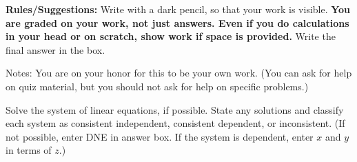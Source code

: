 \documentclass[11pt,addpoints,answers]{exam}
\newcommand{\+}{\, \, + \, \, }
\renewcommand{\-}{\, \, - \, \, }
\renewcommand{\=}{\, \, = \, \, }
\begin{document}


{\small \noindent \textbf{Rules/Suggestions:} Write with a dark pencil, so that your work is visible.  \textbf{You are graded on your work, not just answers. Even if you do calculations in your head or on scratch, show work if space is provided. } Write the final answer in the box.

Notes: You are on your honor for this to be your own work.  (You can ask for help on quiz material, but you should not ask for help on specific problems.) }
\begin{questions}


\setlength\columnsep{1cm}

\question Solve the system of linear equations, if possible.  State any solutions and classify each system as consistent independent, consistent dependent, or inconsistent.  (If not possible, enter DNE in answer box.  If the system is dependent, enter $x$ and $y$ in terms of $z$.)
\begin{multicols}{2}
\end{multicols}
\end{questions}
\end{document}
